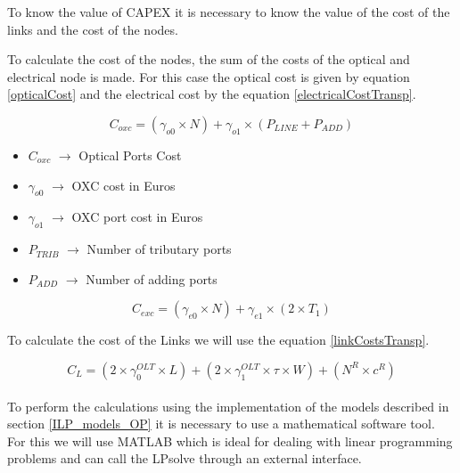 To know the value of CAPEX it is necessary to know the value of the cost of the links and the cost of the nodes.

To calculate the cost of the nodes, the sum of the costs of the optical and electrical node is made. For this case the optical cost is given by equation \ref{opticalCost} and the electrical cost by the equation \ref{electricalCostTransp}.


\begin{equation}
C_{oxc} = \left(\gamma_{o0} \times N \right) + \gamma_{o1} \times  \left(P_{LINE} + P_{ADD}\right)
\label{opticalCost}
\end{equation}	
	
\begin{itemize}
\item{$C_{oxc}$		$\rightarrow$	Optical Ports Cost}
\item{$\gamma_{o0}$	$\rightarrow$	OXC cost in Euros}
\item{$\gamma_{o1}$	$\rightarrow$	OXC port cost in Euros}
\item{$P_{TRIB}	$	$\rightarrow$	Number of tributary ports}
\item{$P_{ADD} $	$\rightarrow$	Number of adding ports}
\end{itemize}

\begin{equation}
C_{exc} = \left(\gamma_{e0}\times N\right) + \gamma_{e1} \times \left(2 \times T_1 \right)		\label{electricalCostTransp}
\end{equation}

\vspace{10pt}

To calculate the cost of the Links we will use the equation \ref{linkCostsTransp}.

\begin{equation}
C_L = \left(2 \times \gamma_0^{OLT} \times L\right) + \left(2 \times \gamma_1^{OLT} \times \tau \times W\right) + \left(N^R \times c^R\right)
\label{linkCostsTransp}
\end{equation} \\
	
\vspace{11pt}
To perform the calculations using the implementation of the models described in section \ref{ILP_models_OP} it is necessary to use a mathematical software tool. For this we will use MATLAB which is ideal for dealing with linear programming problems and can call the LPsolve through an external interface. \\

